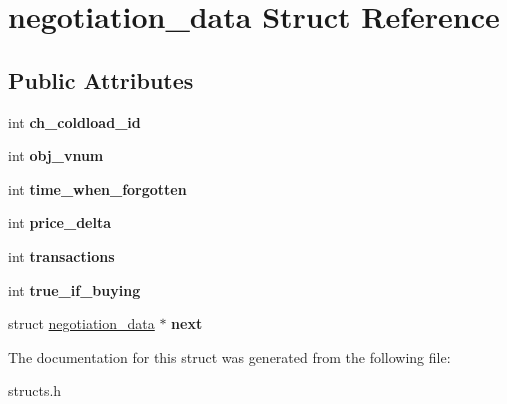 \hypertarget{structnegotiation__data}{\section{negotiation\-\_\-data Struct Reference}
\label{structnegotiation__data}
}
\subsection*{Public Attributes}
\begin{DoxyCompactItemize}
\item 
\hypertarget{structnegotiation__data_a6cb50dbb7c300cfce4c2dc344faf8aa9}{int {\bfseries ch\-\_\-coldload\-\_\-id}}\label{structnegotiation__data_a6cb50dbb7c300cfce4c2dc344faf8aa9}

\item 
\hypertarget{structnegotiation__data_ac2790f175dbb74ef8e3d5f2f116fe4c0}{int {\bfseries obj\-\_\-vnum}}\label{structnegotiation__data_ac2790f175dbb74ef8e3d5f2f116fe4c0}

\item 
\hypertarget{structnegotiation__data_a0deef4af9ec1998d699589a5fe108d82}{int {\bfseries time\-\_\-when\-\_\-forgotten}}\label{structnegotiation__data_a0deef4af9ec1998d699589a5fe108d82}

\item 
\hypertarget{structnegotiation__data_a8f19b98b96a5b01517ef97903e1f9642}{int {\bfseries price\-\_\-delta}}\label{structnegotiation__data_a8f19b98b96a5b01517ef97903e1f9642}

\item 
\hypertarget{structnegotiation__data_af73b88881a030e61e4baca955d841fb8}{int {\bfseries transactions}}\label{structnegotiation__data_af73b88881a030e61e4baca955d841fb8}

\item 
\hypertarget{structnegotiation__data_a53aae7f31645cb5fd8bcc86b5a54b00d}{int {\bfseries true\-\_\-if\-\_\-buying}}\label{structnegotiation__data_a53aae7f31645cb5fd8bcc86b5a54b00d}

\item 
\hypertarget{structnegotiation__data_a63d08f24690474f04312e697f0275c22}{struct \hyperlink{structnegotiation__data}{negotiation\-\_\-data} $\ast$ {\bfseries next}}\label{structnegotiation__data_a63d08f24690474f04312e697f0275c22}

\end{DoxyCompactItemize}


The documentation for this struct was generated from the following file\-:\begin{DoxyCompactItemize}
\item 
structs.\-h\end{DoxyCompactItemize}
